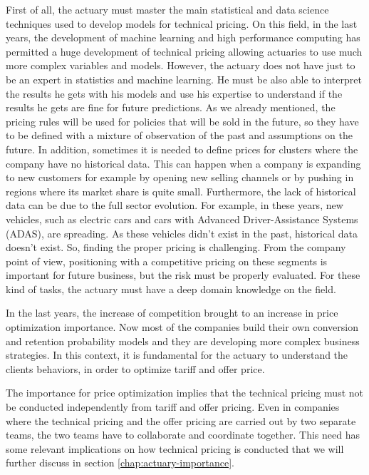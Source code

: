 \documentclass[a4paper, nobind]{templates/ociamthesis}
\theoremstyle{definition}
\theoremstyle{definition}
\theoremstyle{definition}
\theoremstyle{remark}
\begin{document}
First of all, the actuary must master the main statistical and data science techniques used to develop models for technical pricing. On this field, in the last years, the development of machine learning and high performance computing has permitted a huge development of technical pricing allowing actuaries to use much more complex variables and models. However, the actuary does not have just to be an expert in statistics and machine learning. He must be also able to interpret the results he gets with his models and use his expertise to understand if the results he gets are fine for future predictions. As we already mentioned, the pricing rules will be used for policies that will be sold in the future, so they have to be defined with a mixture of observation of the past and assumptions on the future. In addition, sometimes it is needed to define prices for clusters where the company have no historical data. This can happen when a company is expanding to new customers for example by opening new selling channels or by pushing in regions where its market share is quite small. Furthermore, the lack of historical data can be due to the full sector evolution. For example, in these years, new vehicles, such as electric cars and cars with Advanced Driver-Assistance Systems (ADAS), are spreading. As these vehicles didn't exist in the past, historical data doesn't exist. So, finding the proper pricing is challenging. From the company point of view, positioning with a competitive pricing on these segments is important for future business, but the risk must be properly evaluated. For these kind of tasks, the actuary must have a deep domain knowledge on the field.

In the last years, the increase of competition brought to an increase in price optimization importance. Now most of the companies build their own conversion and retention probability models and they are developing more complex business strategies. In this context, it is fundamental for the actuary to understand the clients behaviors, in order to optimize tariff and offer price.

The importance for price optimization implies that the technical pricing must not be conducted independently from tariff and offer pricing. Even in companies where the technical pricing and the offer pricing are carried out by two separate teams, the two teams have to collaborate and coordinate together. This need has some relevant implications on how technical pricing is conducted that we will further discuss in section \ref{chap:actuary-importance}.
\end{document}
